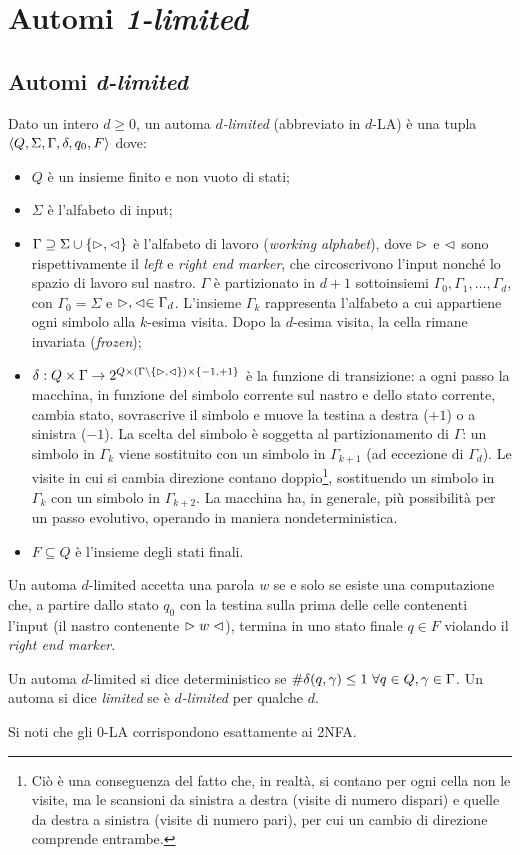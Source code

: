 \chapter{Automi \emph{1-limited}}



\section{Automi \emph{d-limited}}
\begin{defin}
	Dato un intero $d\geq 0$, un automa \emph{$d$-limited} (abbreviato in $d$-LA) è una tupla $\langle Q,\Sigma,\Gamma,\delta,q_0,F \rangle$ dove:
	\begin{itemize}
		\item $Q$ è un insieme finito e non vuoto di stati;
		\item $\Sigma$ è l'alfabeto di input;
		\item $\Gamma\supseteq\Sigma\cup\left\{ \vartriangleright,\vartriangleleft \right\}$ è l'alfabeto di lavoro (\emph{working alphabet}), dove $\vartriangleright$ e $\vartriangleleft$ sono rispettivamente il \emph{left} e \emph{right end marker}, che circoscrivono l'input nonché lo spazio di lavoro sul nastro. $\Gamma$ è partizionato in $d+1$ sottoinsiemi $\Gamma_0,\Gamma_1,\dots,\Gamma_d$, con $\Gamma_0=\Sigma$ e $\vartriangleright,\vartriangleleft\in\Gamma_d$. L'insieme $\Gamma_k$ rappresenta l'alfabeto a cui appartiene ogni simbolo alla $k$-esima visita. Dopo la $d$-esima visita, la cella rimane invariata (\emph{frozen});
		\item $\delta:Q\times\Gamma\to 2^{Q\times(\Gamma\setminus\left\{ \vartriangleright,\vartriangleleft \right\})\times\left\{ -1,+1 \right\}}$ è la funzione di transizione: a ogni passo la macchina, in funzione del simbolo corrente sul nastro e dello stato corrente, cambia stato, sovrascrive il simbolo e muove la testina a destra ($+1$) o a sinistra ($-1$). La scelta del simbolo è soggetta al partizionamento di $\Gamma$: un simbolo in $\Gamma_k$ viene sostituito con un simbolo in $\Gamma_{k+1}$ (ad eccezione di $\Gamma_d$). Le visite in cui si cambia direzione contano doppio\footnote{Ciò è una conseguenza del fatto che, in realtà, si contano per ogni cella non le visite, ma le scansioni da sinistra a destra (visite di numero dispari) e quelle da destra a sinistra (visite di numero pari), per cui un cambio di direzione comprende entrambe.}, sostituendo un simbolo in $\Gamma_k$ con un simbolo in $\Gamma_{k+2}$. La macchina ha, in generale, più possibilità per un passo evolutivo, operando in maniera nondeterministica.
		\item $F\subseteq Q$ è l'insieme degli stati finali.
	\end{itemize}
	Un automa $d$-limited accetta una parola $w$ se e solo se esiste una computazione che, a partire dallo stato $q_0$ con la testina sulla prima delle celle contenenti l'input (il nastro contenente $\vartriangleright w\vartriangleleft$), termina in uno stato finale $q\in F$ violando il \emph{right end marker}.

	Un automa $d$-limited si dice deterministico se $\# \delta(q,\gamma)\leq 1 ~ \forall q\in Q,\gamma\in\Gamma$. Un automa si dice \emph{limited} se è \emph{$d$-limited} per qualche $d$.
\end{defin}
Si noti che gli 0-LA corrispondono esattamente ai 2NFA.



